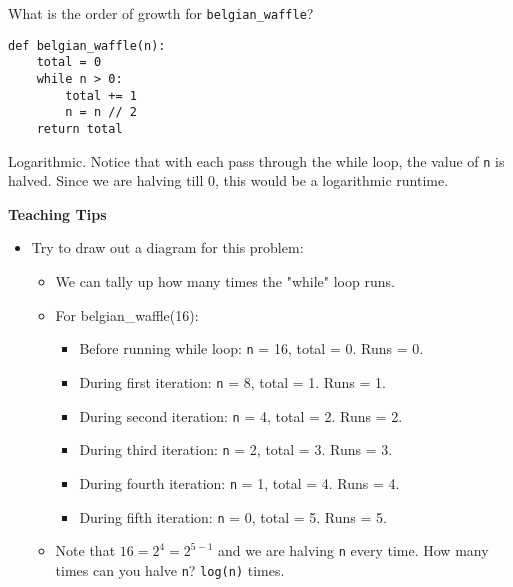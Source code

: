 \begin{blocksection}
\question What is the order of growth for \lstinline{belgian_waffle}? \\
\begin{lstlisting}
def belgian_waffle(n):
    total = 0
    while n > 0:
        total += 1
        n = n // 2
    return total
\end{lstlisting}

\begin{solution}
Logarithmic. Notice that with each pass through the while loop, the value of \lstinline{n} is halved. Since we are halving till 0, this would be a logarithmic runtime.
\end{solution}

\begin{guide}
    \textbf{Teaching Tips}
    \begin{itemize}
       \item Try to draw out a diagram for this problem:
       \begin{itemize}
            \item We can tally up how many times the "while" loop runs. 
            \item For belgian\_waffle(16):
            \begin{itemize}
                \item Before running while loop: \lstinline{n} = 16, total = 0. Runs = 0.
                \item During first iteration: \lstinline{n} = 8, total = 1. Runs = 1.
                \item During second iteration: \lstinline{n} = 4, total = 2. Runs = 2.
                \item During third iteration: \lstinline{n} = 2, total = 3. Runs = 3.
                \item During fourth iteration: \lstinline{n} = 1, total = 4. Runs = 4.
                \item During fifth iteration: \lstinline{n} = 0, total = 5. Runs = 5.
            \end{itemize}
            \item Note that $16 = 2^4 = 2^{5 - 1}$ and we are halving \lstinline{n} every time. How many times can you halve \lstinline{n}? \lstinline{log(n)} times.
       \end{itemize}
    \end{itemize}
 \end{guide}

\end{blocksection}